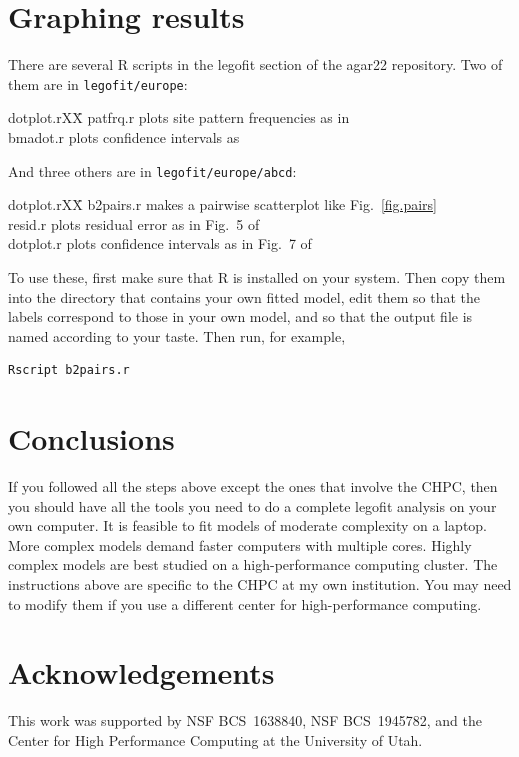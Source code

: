 \documentclass[11pt]{article}
\newenvironment{leftindent}%
{\begin{list}{}%
         {\setlength{\leftmargin}{2em}}%
         \item[]%
}{\end{list}}
\begin{document}
\section{Graphing results}
\label{sec.graph}
There are several R scripts in the legofit section of the agar22
repository. Two of them are in \texttt{legofit/europe}:
\begin{leftindent}
\begin{tabbing}
  dotplot.rXX\=\kill
patfrq.r \> plots site pattern frequencies as in
    \citet[Fig.~3]{Rogers:arXiv-2201.02668}\\ 
bmadot.r \> plots confidence intervals as 
  \citet[Fig.~7]{Rogers:PCJ-2-e32}
\end{tabbing}
\end{leftindent}
And three others are in \texttt{legofit/europe/abcd}:
\begin{leftindent}
\begin{tabbing}
  dotplot.rXX\=\kill
b2pairs.r \> makes a pairwise scatterplot like
  Fig.~\ref{fig.pairs}\\
resid.r \> plots residual error as in Fig.~5 of \citep{Rogers:PCJ-2-e32}\\
dotplot.r \> plots confidence intervals as in Fig.~7 of
  \citep{Rogers:PCJ-2-e32}
\end{tabbing}
\end{leftindent}
To use these, first make sure that R is installed on your system. Then
copy them into the directory that contains your own fitted model, edit
them so that the labels correspond to those in your own model, and so
that the output file is named according to your taste. Then run, for
example,
\begin{verbatim}
Rscript b2pairs.r
\end{verbatim}

\section{Conclusions}
\label{sec.conclusions}
If you followed all the steps above except the ones that involve the
CHPC, then you should have all the tools you need to do a complete
legofit analysis on your own computer. It is feasible to fit models of
moderate complexity on a laptop. More complex models demand faster
computers with multiple cores. Highly complex models are best studied
on a high-performance computing cluster. The instructions above are
specific to the CHPC at my own institution. You may need to modify
them if you use a different center for high-performance computing.

\section*{Acknowledgements}
This work was supported by NSF BCS~1638840, NSF BCS~1945782, and the Center
for High Performance Computing at the University of Utah.

\printbibliography
\end{document}
